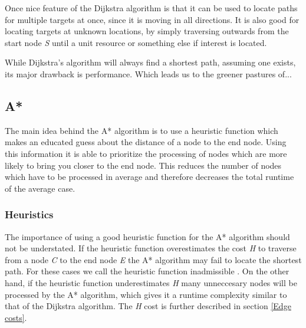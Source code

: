 \documentclass[12pt, a4paper]{article}
\begin{document}

Once nice feature of the Dijkstra algorithm is that it can be used to locate
paths for multiple targets at once, since it is moving in all directions. It is
also good for locating targets at unknown locations, by simply traversing
outwards from the start node \textit{S} until a unit resource or something else
if interest is located.

While Dijkstra's algorithm will always find a shortest path, assuming one exists, its
major drawback is performance. Which leads us to the greener pastures of...



\subsection{A*}


The main idea behind the A* algorithm is to use a heuristic function which makes
an educated guess about the distance of a node to the end node. Using this
information it is able to prioritize the processing of nodes which are more
likely to bring you closer to the end node. This reduces the number of nodes
which have to be processed in average and therefore decreases the total runtime
of the average case.


\subsubsection{Heuristics}
\label{Heuristics}

The importance of using a good heuristic function for the A* algorithm should
not be understated. If the heuristic function overestimates the cost \textit{H}
to traverse from a node \textit{C} to the end node \textit{E} the A* algorithm
may fail to locate the shortest path. For these cases we call the heuristic
function inadmissible \cite{astar2}. On the other hand, if the heuristic
function underestimates \textit{H} many unneccesary nodes will be processed by
the A* algorithm, which gives it a runtime complexity similar to that of the
Dijkstra algorithm. The \textit{H} cost is further described in section
\ref{Edge costs}.
\end{document}
